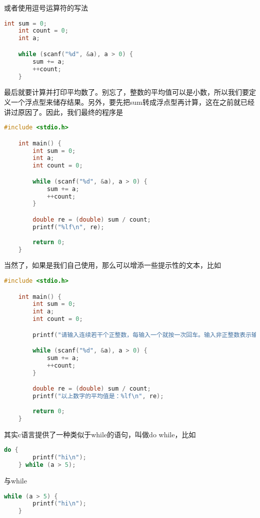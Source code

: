 或者使用逗号运算符的写法

\begin{lstlisting}[language=C]
    int sum = 0;
    int count = 0;
    int a;

    while (scanf("%d", &a), a > 0) {
        sum += a;
        ++count;
    }
\end{lstlisting}

最后就要计算并打印平均数了。别忘了，整数的平均值可以是小数，所以我们要定义一个浮点型来储存结果。另外，要先把sum转成浮点型再计算，这在之前就已经讲过原因了。因此，我们最终的程序是

\begin{lstlisting}[language=C]
    #include <stdio.h>

    int main() {
        int sum = 0;
        int a;
        int count = 0;

        while (scanf("%d", &a), a > 0) {
            sum += a;
            ++count;
        }

        double re = (double) sum / count;
        printf("%lf\n", re);
        
        return 0;
    }
\end{lstlisting}

当然了，如果是我们自己使用，那么可以增添一些提示性的文本，比如

\begin{lstlisting}[language=C]
    #include <stdio.h>

    int main() {
        int sum = 0;
        int a;
        int count = 0;

        printf("请输入连续若干个正整数，每输入一个就按一次回车。输入非正整数表示输入完成\n");

        while (scanf("%d", &a), a > 0) {
            sum += a;
            ++count;
        }

        double re = (double) sum / count;
        printf("以上数字的平均值是：%lf\n", re);
        
        return 0;
    }
\end{lstlisting}

其实c语言提供了一种类似于while的语句，叫做do while，比如

\begin{lstlisting}[language=C]
    do {
        printf("hi\n");
    } while (a > 5);
\end{lstlisting}

与while

\begin{lstlisting}[language=C]
    while (a > 5) {
        printf("hi\n");
    }
\end{lstlisting}

